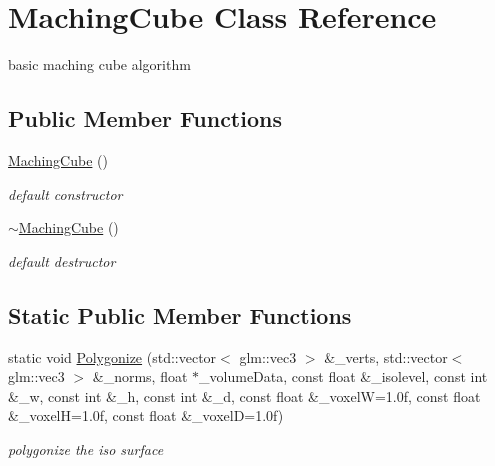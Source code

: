 \hypertarget{classMachingCube}{}\section{Maching\+Cube Class Reference}
\label{classMachingCube}


basic maching cube algorithm  


\subsection*{Public Member Functions}
\begin{DoxyCompactItemize}
\item 
\hyperlink{classMachingCube_a47dca85496623aab6ee3ff0913db7d31}{Maching\+Cube} ()\hypertarget{classMachingCube_a47dca85496623aab6ee3ff0913db7d31}{}\label{classMachingCube_a47dca85496623aab6ee3ff0913db7d31}

\begin{DoxyCompactList}\small\item\em default constructor \end{DoxyCompactList}\item 
\hyperlink{classMachingCube_ab5b708b039b62182c2dc526a6ac6a181}{$\sim$\+Maching\+Cube} ()\hypertarget{classMachingCube_ab5b708b039b62182c2dc526a6ac6a181}{}\label{classMachingCube_ab5b708b039b62182c2dc526a6ac6a181}

\begin{DoxyCompactList}\small\item\em default destructor \end{DoxyCompactList}\end{DoxyCompactItemize}
\subsection*{Static Public Member Functions}
\begin{DoxyCompactItemize}
\item 
static void \hyperlink{classMachingCube_a5d38039696b93a4d555be3a2a49f684f}{Polygonize} (std\+::vector$<$ glm\+::vec3 $>$ \&\+\_\+verts, std\+::vector$<$ glm\+::vec3 $>$ \&\+\_\+norms, float $\ast$\+\_\+volume\+Data, const float \&\+\_\+isolevel, const int \&\+\_\+w, const int \&\+\_\+h, const int \&\+\_\+d, const float \&\+\_\+voxelW=1.\+0f, const float \&\+\_\+voxel\+H=1.\+0f, const float \&\+\_\+voxel\+D=1.\+0f)\hypertarget{classMachingCube_a5d38039696b93a4d555be3a2a49f684f}{}\label{classMachingCube_a5d38039696b93a4d555be3a2a49f684f}

\begin{DoxyCompactList}\small\item\em polygonize the iso surface \end{DoxyCompactList}\end{DoxyCompactItemize}
